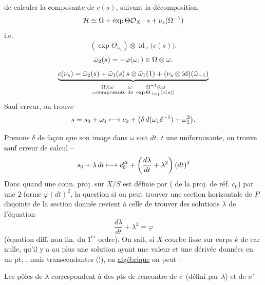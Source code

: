  de calculer la composante  de $c(s)$, suivant la \inserted{$\Omega\otimes\omega$}  décomposition
\[
\mathcal{H}\simeq\Omega+{{\exp\Theta}}\mathcal{O}_X\cdot s+\nu_s(\Omega^{-1})
\]
i.e.
\[
(\exp\Theta_{\omega_1})\otimes\operatorname{id}_{\omega}\bigl(c(s)\bigr).
\]
\[
{{\bar\omega_2(s)=-\varphi(\omega_1)\in\Omega\otimes\omega}.}
\]
\[
{\underbrace{c(\nu_s)=\bar\omega_2(s)+{\bar\omega_1(s)}\,{s\otimes\bar\omega_1(1)}+(\nu_s\otimes\operatorname{id})(\bar\omega_{-1})}_{\substack{\Omega\otimes\omega\qquad\omega\qquad\Omega^{-1}\otimes\omega\\=\text{composante de }\exp\Theta_{+\omega_1}(c(s))}}}
\]
Sauf erreur, on trouve
\[
s=s_0+\omega_1\longmapsto c_0+\bigl(\delta\,d({\omega_1\delta^{-1}})+\omega_1^2\bigr).
\]

Prenons $\delta$ de façon que son image dans $\omega$ soit $dt$, $t$ une uniformisante, on trouve sauf erreur de calcul --
\[
s_0+\lambda\,dt\longmapsto c_0^{{{dt}}}+\left(\frac{d\lambda}{dt}+\lambda^2\right)(dt)^2
\]
Donc quand une conn. proj. sur $X/S$ est définie par ( de la  proj. de réf. $c_0$) par une $2$-forme $\varphi(dt)^2$, la question si on peut trouver une section horizontale de $P$ disjointe de la section donnée revient à celle de trouver des solutions $\lambda$ de l'équation
\[
\frac{d\lambda}{dt}+\lambda^2=\varphi
\]
(équation diff. non lin. du $1^{\mathrm{er}}$ ordre). On sait, si $X$ courbe lisse sur corps $k$ de car nulle, qu'il y a au plus une solution ayant une valeur et une dérivée données en un pt; , mais transcendantes (!), en \uline{algébrique} on peut  --

Les pôles de $\lambda$  correspondent à des pts de rencontre de $\sigma$  (défini par $\lambda$) et de $\sigma'$ --

